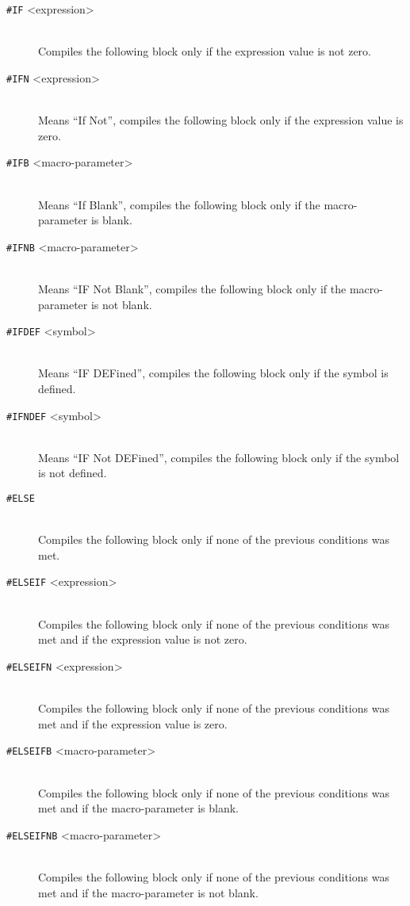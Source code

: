     \begin{description}
        \item[\texttt{\#IF} <expression>]~\\
            Compiles the following block only if the expression value is not zero.
        \item[\texttt{\#IFN} <expression>]~\\
            Means ``If Not'', compiles the following block only if the expression value is zero.
        \item[\texttt{\#IFB} <macro-parameter>]~\\
            Means ``If Blank'', compiles the following block only if the macro-parameter is blank.
        \item[\texttt{\#IFNB} <macro-parameter>]~\\
            Means ``IF Not Blank'', compiles the following block only if the macro-parameter is not blank.
        \item[\texttt{\#IFDEF}  <symbol>]~\\
            Means ``IF DEFined'', compiles the following block only if the symbol is defined.
        \item[\texttt{\#IFNDEF} <symbol>]~\\
            Means ``IF Not DEFined'', compiles the following block only if the symbol is not defined.
        \item[\texttt{\#ELSE}]~\\
            Compiles the following block only if none of the previous conditions was met.
        \item[\texttt{\#ELSEIF} <expression>]~\\
            Compiles the following block only if none of the previous conditions was met and if the expression value is not zero.
        \item[\texttt{\#ELSEIFN} <expression>]~\\
            Compiles the following block only if none of the previous conditions was met and if the expression value is zero.
        \item[\texttt{\#ELSEIFB} <macro-parameter>]~\\
            Compiles the following block only if none of the previous conditions was met and if the macro-parameter is blank.
        \item[\texttt{\#ELSEIFNB} <macro-parameter>]~\\
            Compiles the following block only if none of the previous conditions was met and if the macro-parameter is not blank.

\end{description}
